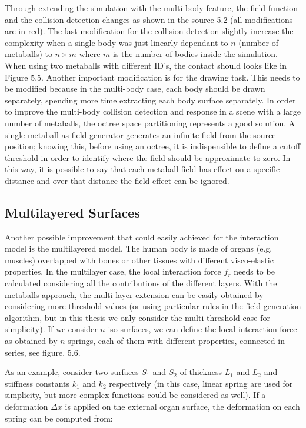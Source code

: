 \documentclass[journal]{vgtc}                %
\begin{document}
Through extending the simulation with the multi-body feature, the field function and
the collision detection changes as shown in the source 5.2 (all modifications are in
red). The last modification for the collision detection slightly increase the complexity
when a single body was just linearly dependant to $n$ (number of metaballs) to $n \times m $ where $m$ is the number of bodies inside the simulation. When using two metaballs with different ID’s, the contact should looks like in Figure
5.5. Another important modification is for the drawing task. This needs to be
modified because in the multi-body case, each body should be drawn separately,
spending more time extracting each body surface separately. In order to improve the
multi-body collision detection and response in a scene with a large number of
metaballs, the octree space partitioning represents a good solution. A single metaball
as field generator generates an infinite field from the source position; knowing this,
before using an octree, it is indispensible to define a cutoff threshold in order to
identify where the field should be approximate to zero. In this way, it is possible to
say that each metaball field has effect on a specific distance and over that distance
the field effect can be ignored.

\subsection{Multilayered Surfaces}

Another possible improvement that could easily achieved for the interaction model is
the multilayered model. The human body is made of organs (e.g. muscles)
overlapped with bones or other tissues with different visco-elastic properties. In the
multilayer case, the local interaction force $f_{r}$ needs to be calculated considering all
the contributions of the different layers. With the metaballs approach, the multi-layer
extension can be easily obtained by considering more threshold values (or using
particular rules in the field generation algorithm, but in this thesis we only consider
the multi-threshold case for simplicity). If we consider $n$ iso-surfaces, we can define
the local interaction force as obtained by $n$ springs, each of them with different
properties, connected in series, see figure. 5.6.

As an example, consider two surfaces $S_{1}$ and $S_{2}$  of thickness $L_{1}$ and $L_{2}$
and stiffness constants $k_{1}$ and $k_{2}$ respectively (in this case, linear spring are used for simplicity, but
more complex functions could be considered as well). If a deformation $\Delta x$ is applied
on the external organ surface, the deformation on each spring can be computed from:
\end{document}
